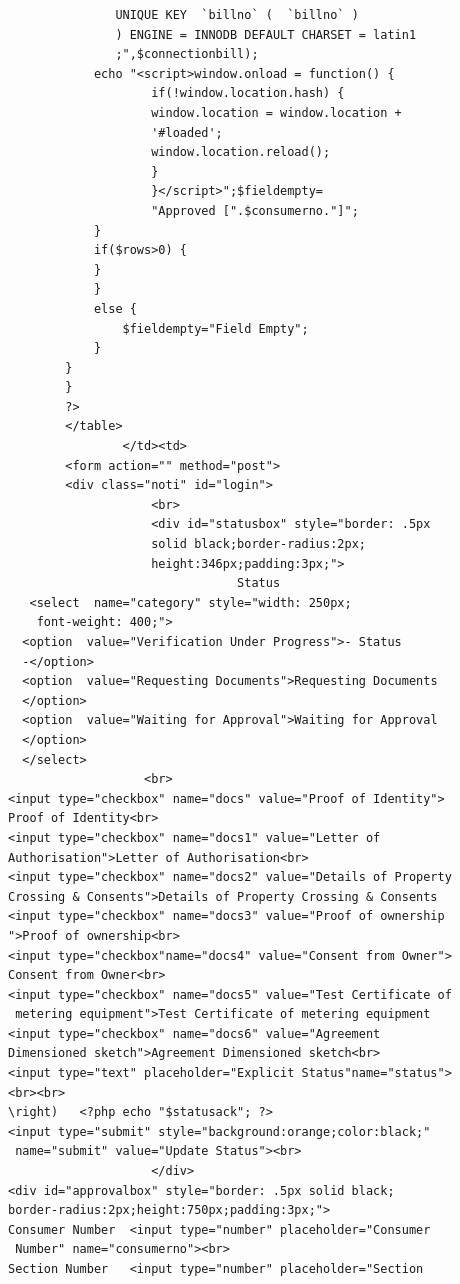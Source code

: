 \documentclass[12pt,a4paper,oneside]{report}
\begin{document}
\begin{lstlisting}
               UNIQUE KEY  `billno` (  `billno` )
               ) ENGINE = INNODB DEFAULT CHARSET = latin1
               ;",$connectionbill);
            echo "<script>window.onload = function() {
                    if(!window.location.hash) {
                    window.location = window.location + 
                    '#loaded';
                    window.location.reload();   
                    }
                    }</script>";$fieldempty=
                    "Approved [".$consumerno."]";
            }
            if($rows>0) {
            }
            }
            else {
                $fieldempty="Field Empty";
            }
        }
        }
        ?>
        </table>
                </td><td>
        <form action="" method="post">
		<div class="noti" id="login">
                    <br>
                    <div id="statusbox" style="border: .5px 
                    solid black;border-radius:2px;
                    height:346px;padding:3px;">				
                                Status
   <select  name="category" style="width: 250px;
	font-weight: 400;">
  <option  value="Verification Under Progress">- Status 
  -</option>
  <option  value="Requesting Documents">Requesting Documents
  </option>
  <option  value="Waiting for Approval">Waiting for Approval
  </option>
  </select>
                   <br>              
<input type="checkbox" name="docs" value="Proof of Identity">
Proof of Identity<br>
<input type="checkbox" name="docs1" value="Letter of 
Authorisation">Letter of Authorisation<br>
<input type="checkbox" name="docs2" value="Details of Property 
Crossing & Consents">Details of Property Crossing & Consents
<input type="checkbox" name="docs3" value="Proof of ownership
">Proof of ownership<br>
<input type="checkbox"name="docs4" value="Consent from Owner">
Consent from Owner<br>
<input type="checkbox" name="docs5" value="Test Certificate of
 metering equipment">Test Certificate of metering equipment
<input type="checkbox" name="docs6" value="Agreement 
Dimensioned sketch">Agreement Dimensioned sketch<br>                                
<input type="text" placeholder="Explicit Status"name="status">
<br><br>                    
\right)   <?php echo "$statusack"; ?>
<input type="submit" style="background:orange;color:black;"
 name="submit" value="Update Status"><br>
                    </div>
<div id="approvalbox" style="border: .5px solid black;
border-radius:2px;height:750px;padding:3px;">
Consumer Number  <input type="number" placeholder="Consumer
 Number" name="consumerno"><br>
Section Number   <input type="number" placeholder="Section

\end{lstlisting}
\end{document}
